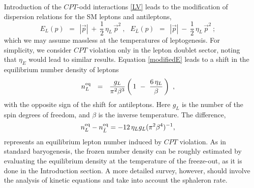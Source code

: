 \documentclass[12pt]{revtex4}
\newcommand{\eq}{{\rm eq}}
\begin{document}
Introduction of the $CPT$-odd interactions \eqref{LV} leads to the modification of 
dispersion relations for the SM leptons and antileptons, 
\begin{equation}
	E_L(p) ~~=~~ |\vec{p}| ~+~ \frac 12\, \eta_L\, \vec{p}^2~, ~~~ 
E_{\bar L}(p) ~~=~~ |\vec{p}| ~-~ \frac 12\, \eta_L\, \vec{p}^2~;
\label{modifiedE}
\end{equation}
which we may assume massless at the temperatures of leptogenesis.
For simplicity, we consider $CPT$ violation only in the 
lepton doublet sector, noting that $\eta_E$ would lead to similar results.
Equation \eqref{modifiedE} leads to a shift in the equilibrium number density of leptons
\[
        n_L^\eq ~~=~~ \frac{g_L}{\pi^2 \beta^3}
			\left (\, 1 ~-~ \frac{6\,\eta_L}{\beta} \,\right)~,
\]
with the opposite sign of the shift for antileptons. Here $g_L$ is the number of the spin degrees 
of freedom, and $\beta$ is the inverse temperature. The difference,
\[ 
n_L^\eq - n_{\bar L}^\eq =-12\,\eta_L g_L(\pi^2 \beta^4)^{-1}, 
\]
represents an equilibrium lepton number 
induced by $CPT$ violation. 
As in standard baryogenesis, the frozen number density can be roughly
estimated by evaluating the equilibrium density at the temperature
of the freeze-out, as it is done in the Introduction section.
A more detailed survey, however, should involve the analysis of kinetic equations and
take into account the sphaleron rate.
\end{document}
